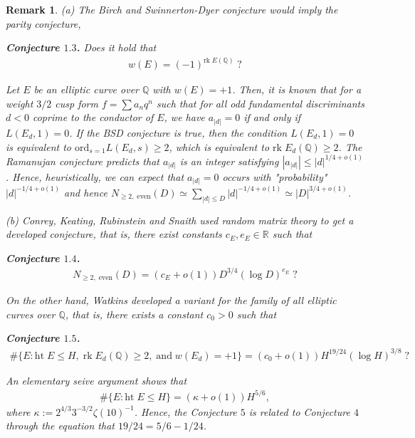 \documentclass[12pt,reqno]{amsart}
\newtheorem{remark}[thm]{Remark}
\numberwithin{equation}{section}
\def\R{{\mathbb R}}
\def\Q{{\mathbb Q}}
\begin{document}
\begin{remark}
{\rm
(a) The Birch and Swinnerton-Dyer conjecture would imply the parity conjecture,

\smallskip

{\bf Conjecture $\mathbf{1.3}$.} Does it hold that
\begin{align*}
w(E) = (-1)^{\text{rk} \; E(\Q)} \; ?
\end{align*}

\smallskip

Let $E$ be an elliptic curve over $\Q$ with $w(E) = +1$. Then, it is known that for a weight $3/2$ cusp form $f = \sum a_nq^n$ such that for all odd fundamental discriminants $d<0$ coprime to the conductor of $E$, we have $a_{|d|} = 0$ if and only if $L(E_d, 1) = 0$. If the BSD conjecture is true, then the condition $L(E_d,1)=0$ is equivalent to $\text{ord}_{s=1} L(E_d, s) \ge 2$, which is equivalent to $\text{rk} \; E_d(\Q) \ge 2$. The Ramanujan conjecture predicts that $a_|d|$ is an integer satisfying $|a_|d|| \le |d|^{1/4 + o(1)}$. Hence, heuristically, we can expect that $a_|d| = 0$ occurs with "probability" $|d|^{-1/4+o(1)}$ and hence $N_{\ge 2, \; \text{even}}(D)  \simeq \sum_{|d| \le D} |d|^{-1/4+o(1)} \simeq |D|^{3/4 + o(1)}$.

\smallskip

(b) Conrey, Keating, Rubinstein and Snaith used random matrix theory to get a developed conjecture, that is, there exist constants $c_E, e_E \in \R$ such that

\smallskip
{\bf Conjecture $\mathbf{1.4}$.}
\begin{align*}
N_{\ge 2, \; \text{even}}(D) = (c_E + o(1))D^{3/4} (\log D)^{e_E}\; ?
\end{align*}

On the other hand, Watkins developed a variant for the family of all elliptic curves over $\Q$, that is, there exists a constant $c_0>0$ such that

\smallskip
{\bf Conjecture $\mathbf{1.5}$.}
\begin{align*}
\# \{E: \text{ht} \; E \le H, \; \text{rk} \; E_d(\Q) \ge 2, \;\text{and} \; w(E_d) = +1 \} =  (c_0 + o(1)) H^{19/24} (\log H)^{3/8}\; ?
\end{align*}

\smallskip

An elementary seive argument shows that 
\begin{align*}
\# \{E: \text{ht} \; E \le H\} = (\kappa + o(1))H^{5/6},
\end{align*}
where $\kappa:=2^{4/3}3^{-3/2} \zeta(10)^{-1}$. Hence, the Conjecture $5$ is related to Conjecture $4$ through the equation that $19/24 = 5/6 - 1/24$.

\smallskip

}
\end{remark}
\end{document}
